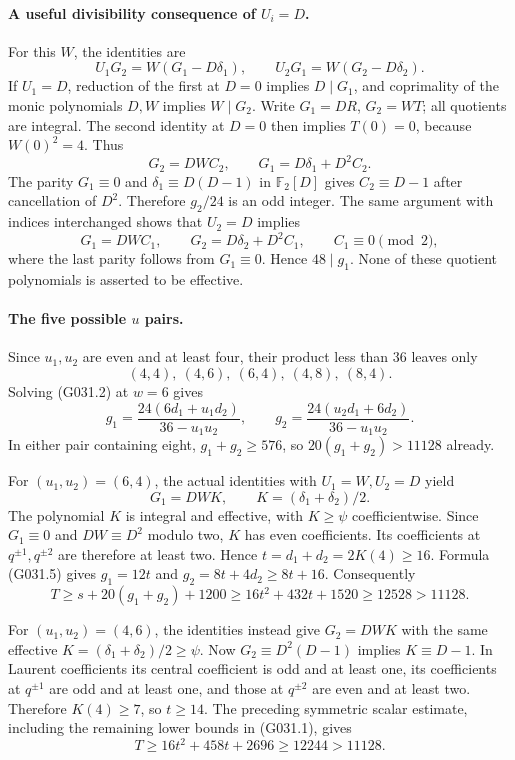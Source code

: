 \paragraph{A useful divisibility consequence of $U_i=D$.}
For this $W$, the identities are
\[
 U_1G_2=W(G_1-D\delta_1),\qquad
 U_2G_1=W(G_2-D\delta_2).                           \tag{G031.3}
\]
If $U_1=D$, reduction of the first at $D=0$ implies
$D\mid G_1$, and coprimality of the monic polynomials
$D,W$ implies $W\mid G_2$. Write $G_1=DR$, $G_2=WT$;
all quotients are integral. The second identity at $D=0$
then implies $T(0)=0$, because $W(0)^2=4$.
Thus
\[
 G_2=DW C_2,\qquad G_1=D\delta_1+D^2C_2.
\]
The parity $G_1\equiv0$ and
$\delta_1\equiv D(D-1)$ in $\mathbb F_2[D]$ gives
$C_2\equiv D-1$ after cancellation of $D^2$.
Therefore $g_2/24$ is an odd integer.
The same argument with indices interchanged shows that
$U_2=D$ implies
\[
 G_1=DW C_1,\qquad G_2=D\delta_2+D^2C_1,
 \qquad C_1\equiv0\pmod2,                          \tag{G031.4}
\]
where the last parity follows from $G_1\equiv0$.
Hence $48\mid g_1$. None of these quotient polynomials
is asserted to be effective.

\paragraph{The five possible $u$ pairs.}
Since $u_1,u_2$ are even and at least four, their product
less than $36$ leaves only
\[
 (4,4),\ (4,6),\ (6,4),\ (4,8),\ (8,4).
\]
Solving (G031.2) at $w=6$ gives
\[
 g_1=\frac{24(6d_1+u_1d_2)}{36-u_1u_2},\qquad
 g_2=\frac{24(u_2d_1+6d_2)}{36-u_1u_2}.             \tag{G031.5}
\]
In either pair containing eight, $g_1+g_2\ge576$,
so $20(g_1+g_2)>11128$ already.

For $(u_1,u_2)=(6,4)$, the actual identities with
$U_1=W,U_2=D$ yield
\[
 G_1=DW K,\qquad K=(\delta_1+\delta_2)/2.
\]
The polynomial $K$ is integral and effective, with
$K\ge\psi$ coefficientwise. Since $G_1\equiv0$ and
$DW\equiv D^2$ modulo two, $K$ has even coefficients.
Its coefficients at $q^{\pm1},q^{\pm2}$ are therefore
at least two. Hence $t=d_1+d_2=2K(4)\ge16$.
Formula (G031.5) gives $g_1=12t$ and
$g_2=8t+4d_2\ge8t+16$. Consequently
\[
 T\ge s+20(g_1+g_2)+1200
    \ge16t^2+432t+1520
    \ge12528>11128.
\]

For $(u_1,u_2)=(4,6)$, the identities instead give
$G_2=DW K$ with the same effective
$K=(\delta_1+\delta_2)/2\ge\psi$.
Now $G_2\equiv D^2(D-1)$ implies $K\equiv D-1$.
In Laurent coefficients its central coefficient is
odd and at least one, its coefficients at $q^{\pm1}$
are odd and at least one, and those at $q^{\pm2}$
are even and at least two. Therefore $K(4)\ge7$,
so $t\ge14$. The preceding symmetric scalar estimate,
including the remaining lower bounds in (G031.1), gives
\[
 T\ge16t^2+458t+2696
    \ge12244>11128.
\]

